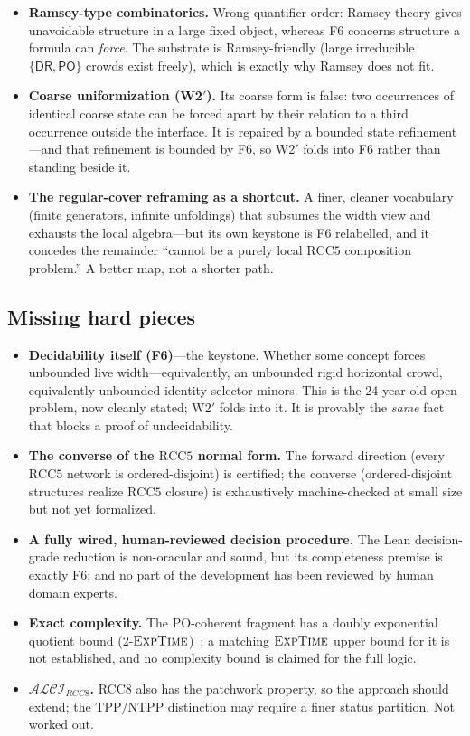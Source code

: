 \documentclass[
]{ceurart}
\theoremstyle{definition}
\newcommand{\ALCIRCC}[1]{\ensuremath{\mathcal{ALCI}_{\mathit{RCC#1}}}}
\newcommand{\DR}{\ensuremath{\mathsf{DR}}}
\newcommand{\PO}{\ensuremath{\mathsf{PO}}}
\newcommand{\EXPTIME}{\textsc{ExpTime}}
\begin{document}
\begin{itemize}
    $\mathrm{RCC5}$-consistent.
  \item \textbf{Ramsey-type combinatorics.}  Wrong quantifier order:
    Ramsey theory gives unavoidable structure in a large fixed object,
    whereas F6 concerns structure a formula can \emph{force}.  The
    substrate is Ramsey-friendly (large irreducible $\{\DR,\PO\}$ crowds
    exist freely), which is exactly why Ramsey does not fit.
  \item \textbf{Coarse uniformization (W2$'$).}  Its coarse form is false:
    two occurrences of identical coarse state can be forced apart by their
    relation to a third occurrence outside the interface.  It is repaired
    by a bounded state refinement---and that refinement is bounded by F6,
    so W2$'$ folds into F6 rather than standing beside it.
  \item \textbf{The regular-cover reframing as a shortcut.}  A finer,
    cleaner vocabulary (finite generators, infinite unfoldings) that
    subsumes the width view and exhausts the local algebra---but its own
    keystone is F6 relabelled, and it concedes the remainder ``cannot be
    a purely local $\mathrm{RCC5}$ composition problem.''  A better map,
    not a shorter path.
\end{itemize}

\subsection{Missing hard pieces}
\label{ssec:missing}

\begin{itemize}
  \item \textbf{Decidability itself (F6)}---the keystone.  Whether some
    concept forces unbounded live width---equivalently, an unbounded rigid
    horizontal crowd, equivalently unbounded identity-selector minors.
    This is the 24-year-old open problem, now cleanly stated; W2$'$ folds
    into it.  It is provably the \emph{same} fact that blocks a proof of
    undecidability.
  \item \textbf{The converse of the $\mathrm{RCC5}$ normal form.}  The
    forward direction (every $\mathrm{RCC5}$ network is ordered-disjoint)
    is certified; the converse (ordered-disjoint structures realize
    $\mathrm{RCC5}$ closure) is exhaustively machine-checked at small size
    but not yet formalized.
  \item \textbf{A fully wired, human-reviewed decision procedure.}  The
    Lean decision-grade reduction is non-oracular and sound, but its
    completeness premise is exactly F6; and no part of the development has
    been reviewed by human domain experts.
  \item \textbf{Exact complexity.}  The PO-coherent fragment has a
    doubly exponential quotient bound (2-$\EXPTIME$)~\cite{TwoTierQuotient};
    a matching $\EXPTIME$ upper bound for it is not established, and no
    complexity bound is claimed for the full logic.
  \item \textbf{$\ALCIRCC{8}$.}  RCC8 also has the patchwork property, so
    the approach should extend; the $\mathrm{TPP}/\mathrm{NTPP}$
    distinction may require a finer status partition.  Not worked out.
\end{itemize}
\end{document}
